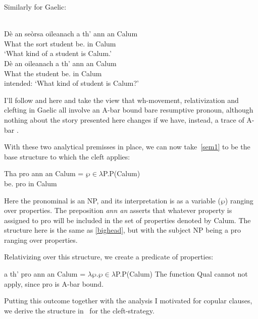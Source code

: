 \documentclass[output=paper]{langsci/langscibook}
\begin{document}
Similarly for Gaelic:


\ea {}\\
    \gll D\`e an se\`orsa oileanach a th' {ann an} Calum\\
        What the sort student \Rel{} be.\Prs{} in Calum\\
    \glt \enquote*{What kind of a student is Calum.}
\ex {}\\
    \gll * D\`e an oileanach a th' {ann an} Calum\\
         {} What the student \Rel{} be.\Prs{} in Calum\\
    \glt {} intended: `What kind of student is Calum?'
\z

I'll follow \citet{adger-ramchand:05} and \citet{Adger2011} here and
take the view that wh-movement, relativization and clefting in Gaelic all
involve an A-bar bound bare resumptive pronoun, although nothing about the
story presented here changes if we have, instead, a trace of A-bar .

With these two analytical premisses in place, we can
now take~\eqref{sem1} to be the base structure to which the cleft applies:

\ea \label{sem1} \gll  Tha pro {ann an} Calum = $\wp \in \lambda$P.P(Calum)\\
be.\Prs{} pro in Calum\\
\z

Here the pronominal is an NP, and its interpretation is as a variable ($\wp$) ranging over properties. The preposition \emph{ann an} asserts that whatever property is assigned to pro will be included in the set of properties denoted by Calum. The structure here is the same as \eqref{bighead}, but with the subject NP being a pro ranging over properties.

Relativizing over this structure, we create a predicate of properties:

\ea a th' pro {ann an} Calum = $\lambda \wp$.$\wp \in \lambda$P.P(Calum) \z
The function Qual cannot not apply, since pro is A-bar bound.

Putting this outcome together with the analysis I motivated for
copular clauses, we derive the structure in~ for
the cleft-strategy.
\end{document}

